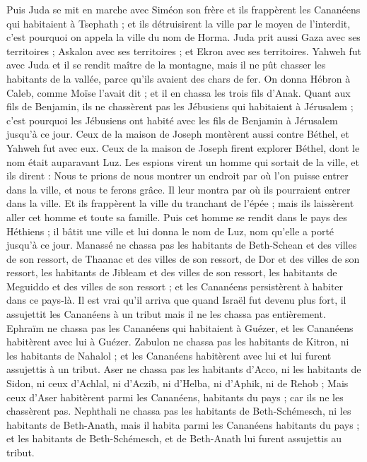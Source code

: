 \begin{multicols}{2}
Puis Juda se mit en marche avec Siméon son frère et ils frappèrent les Cananéens qui habitaient à Tsephath ; et ils détruisirent la ville par le moyen de l'interdit, c'est pourquoi on appela la ville du nom de Horma.
Juda prit aussi Gaza avec ses territoires ; Askalon avec ses territoires ; et Ekron avec ses territoires.
Yahweh fut avec Juda et il se rendit maître de la montagne, mais il ne pût chasser les habitants de la vallée, parce qu'ils avaient des chars de fer.
On donna Hébron à Caleb, comme Moïse l'avait dit ; et il en chassa les trois fils d'Anak.
Quant aux fils de Benjamin, ils ne chassèrent pas les Jébusiens qui habitaient à Jérusalem ; c'est pourquoi les Jébusiens ont habité avec les fils de Benjamin à Jérusalem jusqu'à ce jour.
Ceux de la maison de Joseph montèrent aussi contre Béthel, et Yahweh fut avec eux.
Ceux de la maison de Joseph firent explorer Béthel, dont le nom était auparavant Luz.
Les espions virent un homme qui sortait de la ville, et ils dirent : Nous te prions de nous montrer un endroit par où l'on puisse entrer dans la ville, et nous te ferons grâce.
Il leur montra par où ils pourraient entrer dans la ville. Et ils frappèrent la ville du tranchant de l'épée ; mais ils laissèrent aller cet homme et toute sa famille.
Puis cet homme se rendit dans le pays des Héthiens ; il bâtit une ville et lui donna le nom de Luz, nom qu'elle a porté jusqu'à ce jour.
Manassé ne chassa pas les habitants de Beth-Schean et des villes de son ressort, de Thaanac et des villes de son ressort, de Dor et des villes de son ressort, les habitants de Jibleam et des villes de son ressort, les habitants de Meguiddo et des villes de son ressort ; et les Cananéens persistèrent à habiter dans ce pays-là.
Il est vrai qu'il arriva que quand Israël fut devenu plus fort, il assujettit les Cananéens à un tribut mais il ne les chassa pas entièrement.
Ephraïm ne chassa pas les Cananéens qui habitaient à Guézer, et les Cananéens habitèrent avec lui à Guézer.
Zabulon ne chassa pas les habitants de Kitron, ni les habitants de Nahalol ; et les Cananéens habitèrent avec lui et lui furent assujettis à un tribut.
Aser ne chassa pas les habitants d'Acco, ni les habitants de Sidon, ni ceux d'Achlal, ni d'Aczib, ni d'Helba, ni d'Aphik, ni de Rehob ;
Mais ceux d'Aser habitèrent parmi les Cananéens, habitants du pays ; car ils ne les chassèrent pas.
Nephthali ne chassa pas les habitants de Beth-Schémesch, ni les habitants de Beth-Anath, mais il habita parmi les Cananéens habitants du pays ; et les habitants de Beth-Schémesch, et de Beth-Anath lui furent assujettis au tribut.

\end{multicols}
